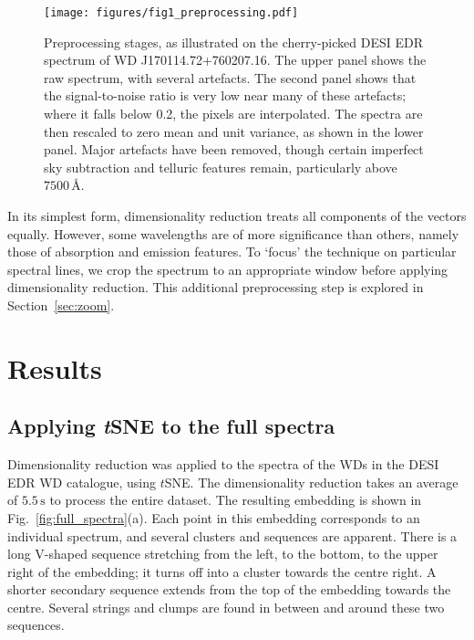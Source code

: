 \documentclass[fleqn,usenatbib]{mnras}
\begin{document}
\begin{figure*}
\centering
\texttt{[image: figures/fig1\_preprocessing.pdf]}
\caption{
    Preprocessing stages, as illustrated on the cherry-picked DESI EDR spectrum of WD J170114.72+760207.16.
    The upper panel shows the raw spectrum, with several artefacts.
    The second panel shows that the signal-to-noise ratio is very low near many of these artefacts; where it falls below 0.2, the pixels are interpolated.
    The spectra are then rescaled to zero mean and unit variance, as shown in the lower panel.
    Major artefacts have been removed, though certain imperfect sky subtraction and telluric features remain, particularly above $7500\,\text{\AA}$.
}
\label{fig:preprocessing}
\end{figure*}

In its simplest form, dimensionality reduction treats all components of the vectors equally.
However, some wavelengths are of more significance than others, namely those of absorption and emission features.
To `focus' the technique on particular spectral lines, we crop the spectrum to an appropriate window before applying dimensionality reduction.
This additional preprocessing step is explored in Section~\ref{sec:zoom}.

\section{Results}
\label{sec:results}

\subsection{Applying \textit{t}SNE to the full spectra}
\label{sec:full_spectra}

Dimensionality reduction was applied to the spectra of the WDs in the DESI EDR WD catalogue, using $t$SNE.
The dimensionality reduction takes an average of $5.5\,\text{s}$ to process the entire dataset.
The resulting embedding is shown in Fig.~\ref{fig:full_spectra}(a).
Each point in this embedding corresponds to an individual spectrum, and several clusters and sequences are apparent.
There is a long V-shaped sequence stretching from the left, to the bottom, to the upper right of the embedding; it turns off into a cluster towards the centre right.
A shorter secondary sequence extends from the top of the embedding towards the centre.
Several strings and clumps are found in between and around these two sequences.
\end{document}
